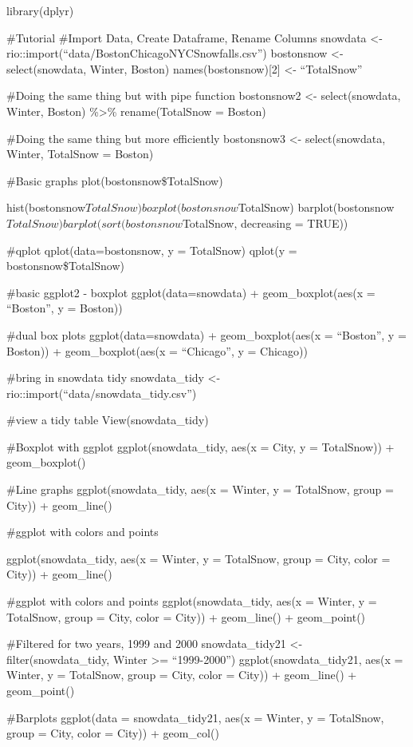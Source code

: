 \documentclass[]{book}
\begin{document}
library(dplyr)

\#Tutorial
\#Import Data, Create Dataframe, Rename Columns
snowdata \textless{}- rio::import(``data/BostonChicagoNYCSnowfalls.csv'')
bostonsnow \textless{}- select(snowdata, Winter, Boston)
names(bostonsnow){[}2{]} \textless{}- ``TotalSnow''

\#Doing the same thing but with pipe function
bostonsnow2 \textless{}- select(snowdata, Winter, Boston) \%\textgreater{}\%
rename(TotalSnow = Boston)

\#Doing the same thing but more efficiently
bostonsnow3 \textless{}- select(snowdata, Winter, TotalSnow = Boston)

\#Basic graphs
plot(bostonsnow\$TotalSnow)

hist(bostonsnow\(TotalSnow) boxplot(bostonsnow\)TotalSnow)
barplot(bostonsnow\(TotalSnow) barplot(sort(bostonsnow\)TotalSnow, decreasing = TRUE))

\#qplot
qplot(data=bostonsnow, y = TotalSnow)
qplot(y = bostonsnow\$TotalSnow)

\#basic ggplot2 - boxplot
ggplot(data=snowdata) +
geom\_boxplot(aes(x = ``Boston'', y = Boston))

\#dual box plots
ggplot(data=snowdata) +
geom\_boxplot(aes(x = ``Boston'', y = Boston)) +
geom\_boxplot(aes(x = ``Chicago'', y = Chicago))

\#bring in snowdata tidy
snowdata\_tidy \textless{}- rio::import(``data/snowdata\_tidy.csv'')

\#view a tidy table
View(snowdata\_tidy)

\#Boxplot with ggplot
ggplot(snowdata\_tidy, aes(x = City, y = TotalSnow)) +
geom\_boxplot()

\#Line graphs
ggplot(snowdata\_tidy, aes(x = Winter, y = TotalSnow, group = City)) +
geom\_line()

\#ggplot with colors and points

ggplot(snowdata\_tidy, aes(x = Winter, y = TotalSnow, group = City, color = City)) +
geom\_line()

\#ggplot with colors and points
ggplot(snowdata\_tidy, aes(x = Winter, y = TotalSnow, group = City, color = City)) +
geom\_line() +
geom\_point()

\#Filtered for two years, 1999 and 2000
snowdata\_tidy21 \textless{}- filter(snowdata\_tidy, Winter \textgreater{}= ``1999-2000'')
ggplot(snowdata\_tidy21, aes(x = Winter, y = TotalSnow, group = City, color = City)) +
geom\_line() +
geom\_point()

\#Barplots
ggplot(data = snowdata\_tidy21, aes(x = Winter, y = TotalSnow, group = City, color = City)) +
geom\_col()
\end{document}
